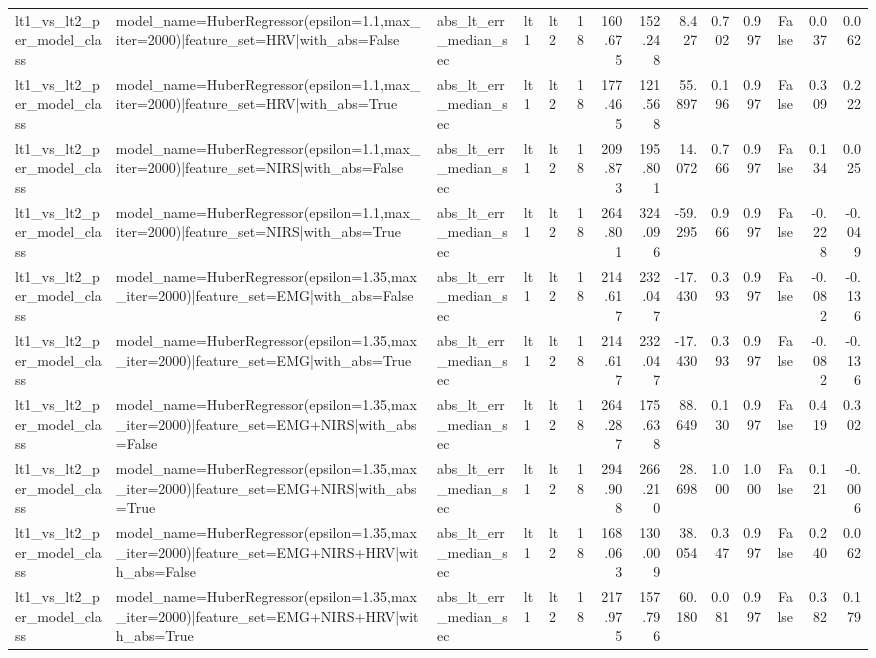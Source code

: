 \begin{table}
\begin{tabular}{lllllrrrrrrrrr}
lt1_vs_lt2_per_model_class & model_name=HuberRegressor(epsilon=1.1,max_iter=2000)|feature_set=HRV|with_abs=False & abs_lt_err_median_sec & lt1 & lt2 & 18 & 160.675 & 152.248 & 8.427 & 0.702 & 0.997 & False & 0.037 & 0.062 \\
lt1_vs_lt2_per_model_class & model_name=HuberRegressor(epsilon=1.1,max_iter=2000)|feature_set=HRV|with_abs=True & abs_lt_err_median_sec & lt1 & lt2 & 18 & 177.465 & 121.568 & 55.897 & 0.196 & 0.997 & False & 0.309 & 0.222 \\
lt1_vs_lt2_per_model_class & model_name=HuberRegressor(epsilon=1.1,max_iter=2000)|feature_set=NIRS|with_abs=False & abs_lt_err_median_sec & lt1 & lt2 & 18 & 209.873 & 195.801 & 14.072 & 0.766 & 0.997 & False & 0.134 & 0.025 \\
lt1_vs_lt2_per_model_class & model_name=HuberRegressor(epsilon=1.1,max_iter=2000)|feature_set=NIRS|with_abs=True & abs_lt_err_median_sec & lt1 & lt2 & 18 & 264.801 & 324.096 & -59.295 & 0.966 & 0.997 & False & -0.228 & -0.049 \\
lt1_vs_lt2_per_model_class & model_name=HuberRegressor(epsilon=1.35,max_iter=2000)|feature_set=EMG|with_abs=False & abs_lt_err_median_sec & lt1 & lt2 & 18 & 214.617 & 232.047 & -17.430 & 0.393 & 0.997 & False & -0.082 & -0.136 \\
lt1_vs_lt2_per_model_class & model_name=HuberRegressor(epsilon=1.35,max_iter=2000)|feature_set=EMG|with_abs=True & abs_lt_err_median_sec & lt1 & lt2 & 18 & 214.617 & 232.047 & -17.430 & 0.393 & 0.997 & False & -0.082 & -0.136 \\
lt1_vs_lt2_per_model_class & model_name=HuberRegressor(epsilon=1.35,max_iter=2000)|feature_set=EMG+NIRS|with_abs=False & abs_lt_err_median_sec & lt1 & lt2 & 18 & 264.287 & 175.638 & 88.649 & 0.130 & 0.997 & False & 0.419 & 0.302 \\
lt1_vs_lt2_per_model_class & model_name=HuberRegressor(epsilon=1.35,max_iter=2000)|feature_set=EMG+NIRS|with_abs=True & abs_lt_err_median_sec & lt1 & lt2 & 18 & 294.908 & 266.210 & 28.698 & 1.000 & 1.000 & False & 0.121 & -0.006 \\
lt1_vs_lt2_per_model_class & model_name=HuberRegressor(epsilon=1.35,max_iter=2000)|feature_set=EMG+NIRS+HRV|with_abs=False & abs_lt_err_median_sec & lt1 & lt2 & 18 & 168.063 & 130.009 & 38.054 & 0.347 & 0.997 & False & 0.240 & 0.062 \\
lt1_vs_lt2_per_model_class & model_name=HuberRegressor(epsilon=1.35,max_iter=2000)|feature_set=EMG+NIRS+HRV|with_abs=True & abs_lt_err_median_sec & lt1 & lt2 & 18 & 217.975 & 157.796 & 60.180 & 0.081 & 0.997 & False & 0.382 & 0.179 \\

\end{tabular}
\end{table}
